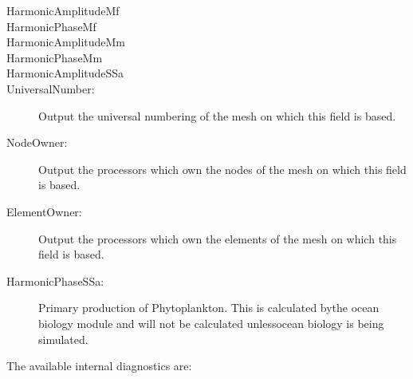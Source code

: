 \begin{description}
\item[HarmonicAmplitudeMf]  
\item[HarmonicPhaseMf]  
\item[HarmonicAmplitudeMm]  
\item[HarmonicPhaseMm]  
\item[HarmonicAmplitudeSSa]  
\item[UniversalNumber:]Output the universal numbering of the mesh on which this field is based.  
\item[NodeOwner:]Output the processors which own the nodes of the mesh on which this field is based.  
\item[ElementOwner:]Output the processors which own the elements of the mesh on which this field is based.  
\item[HarmonicPhaseSSa:]Primary production of Phytoplankton. This is calculated bythe ocean biology module and will not be calculated unlessocean biology is being simulated.  
\end{description}

The available internal   diagnostics are:

